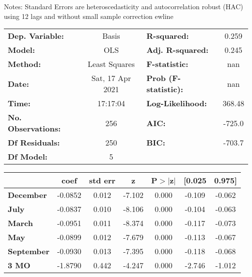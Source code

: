 Notes: \newline
 [1] Standard Errors are heteroscedasticity and autocorrelation robust (HAC) using 12 lags and without small sample correction
ewline\begin{center}
\begin{tabular}{lclc}
\toprule
\textbf{Dep. Variable:}    &      Basis       & \textbf{  R-squared:         } &     0.259   \\
\textbf{Model:}            &       OLS        & \textbf{  Adj. R-squared:    } &     0.245   \\
\textbf{Method:}           &  Least Squares   & \textbf{  F-statistic:       } &       nan   \\
\textbf{Date:}             & Sat, 17 Apr 2021 & \textbf{  Prob (F-statistic):} &      nan    \\
\textbf{Time:}             &     17:17:04     & \textbf{  Log-Likelihood:    } &    368.48   \\
\textbf{No. Observations:} &         256      & \textbf{  AIC:               } &    -725.0   \\
\textbf{Df Residuals:}     &         250      & \textbf{  BIC:               } &    -703.7   \\
\textbf{Df Model:}         &           5      & \textbf{                     } &             \\
\bottomrule
\end{tabular}
\begin{tabular}{lcccccc}
                   & \textbf{coef} & \textbf{std err} & \textbf{z} & \textbf{P$> |$z$|$} & \textbf{[0.025} & \textbf{0.975]}  \\
\midrule
\textbf{December}  &      -0.0852  &        0.012     &    -7.102  &         0.000        &       -0.109    &       -0.062     \\
\textbf{July}      &      -0.0837  &        0.010     &    -8.106  &         0.000        &       -0.104    &       -0.063     \\
\textbf{March}     &      -0.0951  &        0.011     &    -8.374  &         0.000        &       -0.117    &       -0.073     \\
\textbf{May}       &      -0.0899  &        0.012     &    -7.679  &         0.000        &       -0.113    &       -0.067     \\
\textbf{September} &      -0.0930  &        0.013     &    -7.395  &         0.000        &       -0.118    &       -0.068     \\
\textbf{3 MO}      &      -1.8790  &        0.442     &    -4.247  &         0.000        &       -2.746    &       -1.012     \\

\end{tabular}
\end{center}

